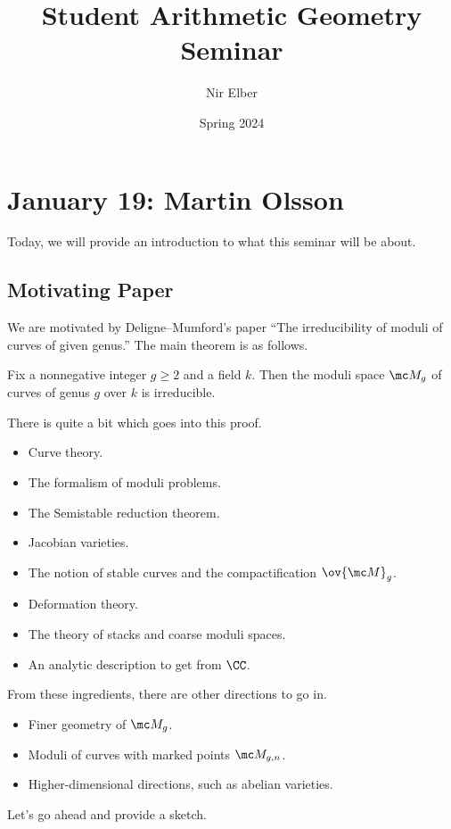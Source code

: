 \documentclass{article}
\title{Student Arithmetic Geometry Seminar}
\author{Nir Elber}
\date{Spring 2024}
\begin{document}
\maketitle

\tableofcontents

\section{January 19: Martin Olsson}
Today, we will provide an introduction to what this seminar will be about.

\subsection{Motivating Paper}
We are motivated by Deligne--Mumford's paper ``The irreducibility of moduli of curves of given genus.'' The main theorem is as follows.
\begin{theorem} \label{thm:dm}
	Fix a nonnegative integer $g\ge2$ and a field $k$. Then the moduli space $\mc M_g$ of curves of genus $g$ over $k$ is irreducible.
\end{theorem}
There is quite a bit which goes into this proof.
\begin{itemize}
	\item Curve theory.
	\item The formalism of moduli problems.
	\item The Semistable reduction theorem.
	\item Jacobian varieties.
	\item The notion of stable curves and the compactification $\ov{\mc M}_g$.
	\item Deformation theory.
	\item The theory of stacks and coarse moduli spaces.
	\item An analytic description to get from $\CC$.
\end{itemize}
From these ingredients, there are other directions to go in.
\begin{itemize}
	\item Finer geometry of $\mc M_g$.
	\item Moduli of curves with marked points $\mc M_{g,n}$.
	\item Higher-dimensional directions, such as abelian varieties.
\end{itemize}
Let's go ahead and provide a sketch.
\end{document}
